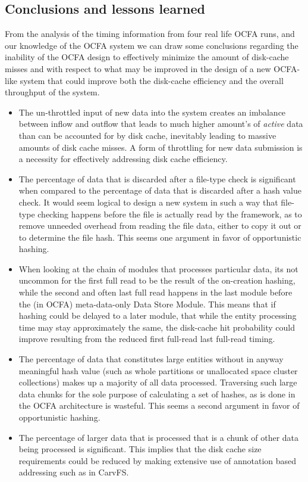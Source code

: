 \subsection{Conclusions and lessons learned}
From the analysis of the timing information from four real life OCFA runs, and our knowledge of the OCFA system we can draw some conclusions regarding the inability of the OCFA design to effectively minimize the amount of disk-cache misses and with respect to what may be improved in the design of a new OCFA-like system that could improve both the disk-cache efficiency and the overall throughput of the system.
\begin{itemize}
\item The un-throttled input of new data into the system creates an imbalance between inflow and outflow that leads to much higher amount's of \emph{active} data than can be accounted for by disk cache, inevitably leading to massive amounts of disk cache misses. A form of throttling for new data submission is a necessity for effectively addressing disk cache efficiency.
\item The percentage of data that is discarded after a file-type check is significant when compared to the percentage of data that is discarded after a hash value check. It would seem logical to design a new system in such a way that file-type checking happens before the file is actually read by the framework, as to remove unneeded overhead from reading the file data, either to copy it out or to determine the file hash. This seems one argument in favor of opportunistic hashing. 
\item When looking at the chain of modules that processes particular data, its not uncommon for the first full read to be the result of the on-creation hashing, while the second and often last full read happens in the last module before the (in OCFA) meta-data-only Data Store Module. This means that if hashing could be delayed to a later module, that while the entity processing time may stay approximately the same, the disk-cache hit probability could improve resulting from the reduced first full-read last full-read timing. 
\item The percentage of data that constitutes large entities without in anyway meaningful hash value (such as whole partitions or unallocated space cluster collections) makes up a majority of all data processed. Traversing such large data chunks for the sole purpose of calculating a set of hashes, as is done in the OCFA architecture is wasteful. This seems a second argument in favor of opportunistic hashing.
\item The percentage of larger data that is processed that is a chunk of other data being processed is significant. This implies that the disk cache size requirements could be reduced by making extensive use of annotation based addressing such as in CarvFS.
\end{itemize}
